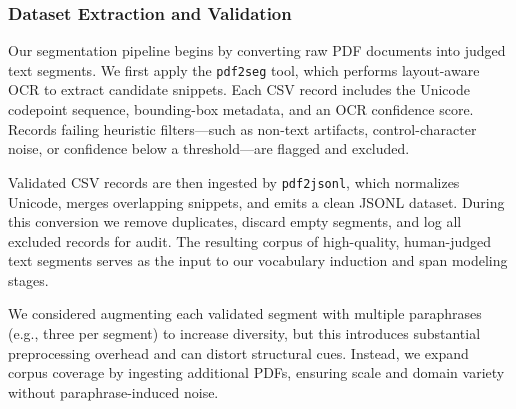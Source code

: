 \subsubsection{Dataset Extraction and Validation}
\label{sec:dataset-extraction}

Our segmentation pipeline begins by converting raw PDF documents into judged text segments.  We first apply the \texttt{pdf2seg} tool, which performs layout-aware OCR to extract candidate snippets.  Each CSV record includes the Unicode codepoint sequence, bounding-box metadata, and an OCR confidence score.  Records failing heuristic filters—such as non-text artifacts, control-character noise, or confidence below a threshold—are flagged and excluded.

Validated CSV records are then ingested by \texttt{pdf2jsonl}, which normalizes Unicode, merges overlapping snippets, and emits a clean JSONL dataset.  During this conversion we remove duplicates, discard empty segments, and log all excluded records for audit.  The resulting corpus of high-quality, human-judged text segments serves as the input to our vocabulary induction and span modeling stages.

We considered augmenting each validated segment with multiple paraphrases (e.g., three per segment) to increase diversity, but this introduces substantial preprocessing overhead and can distort structural cues.  Instead, we expand corpus coverage by ingesting additional PDFs, ensuring scale and domain variety without paraphrase-induced noise.